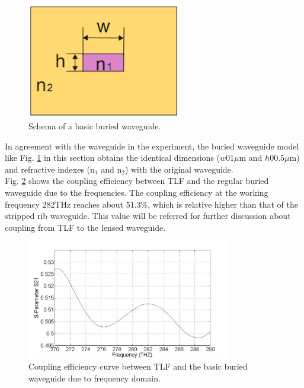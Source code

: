 \begin{figure}[!ht]
\centering
\includegraphics[width=0.6\textwidth]{bilder/buried_waveguide}
\caption{Schema of a basic buried waveguide.}
\label{fig:buried_waveguide}
\end{figure}
In agreement with the waveguide in the experiment, the buried waveguide model like Fig. \ref{fig:buried_waveguide} in this section obtains the identical dimensions ($w01\mu$m and $h00.5\mu$m) and refractive indexes (n$_{1}$ and n$_{2}$) with the original waveguide.\\ 
Fig. \ref{fig:curve_coupling_basic_buried_waveguide} shows the coupling efficiency between TLF and the regular buried waveguide due to the frequencies. The coupling efficiency at the working frequency $282$THz reaches about $51.3\%$, which is relative higher than that of the stripped rib waveguide. This value will be referred for further discussion about coupling from TLF to the lensed waveguide.  
\begin{figure}[!ht]
\centering
\includegraphics[width=0.8\textwidth]{bilder/s21_sym_waveguide}
\caption{Coupling efficiency curve between TLF and the basic buried waveguide due to frequency domain.}
\label{fig:curve_coupling_basic_buried_waveguide}
\end{figure}
